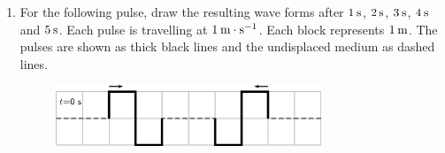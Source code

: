 \begin{enumerate}[noitemsep, label=\textbf{\arabic*}. ]
\begin{figure}[H]
 \end{figure}   

    \addtocounter{footnote}{-0}
            \label{m38802*uid58}\item For the following pulse, draw the resulting wave forms after \begin{math}1\phantom{\rule{2pt}{0ex}}\mathrm{s}\end{math}, \begin{math}2\phantom{\rule{2pt}{0ex}}\mathrm{s}\end{math}, \begin{math}3\phantom{\rule{2pt}{0ex}}\mathrm{s}\end{math}, \begin{math}4\phantom{\rule{2pt}{0ex}}\mathrm{s}\end{math} and \begin{math}5\phantom{\rule{2pt}{0ex}}\mathrm{s}\end{math}. Each pulse is travelling at \begin{math}1\phantom{\rule{2pt}{0ex}}\mathrm{m}\ensuremath{\cdot}\mathrm{s}{}^{-1}\end{math}. Each block represents \begin{math}1\phantom{\rule{2pt}{0ex}}\mathrm{m}\end{math}. The pulses are shown as thick black lines and the undisplaced medium as dashed lines.
    \setcounter{subfigure}{0}


	\begin{figure}[H] %
    \begin{center}
    \label{m38802*id316495!!!underscore!!!media}\label{m38802*id316495!!!underscore!!!printimage}\includegraphics[width=300px]{col11305.imgs/m38802_PG10C4_026.png} %
        
      \vspace{2pt}
    \vspace{.1in}
    
    \end{center}

 \end{figure}   


\end{enumerate}
